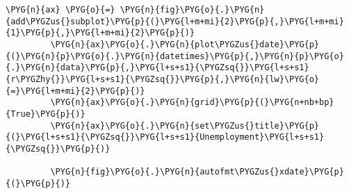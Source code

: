 \documentclass[letterpaper,10pt,openany,oneside,english]{sphinxmanual}
\begin{document}
\begin{Verbatim}[commandchars=\\\{\}]
         \PYG{n}{ax} \PYG{o}{=} \PYG{n}{fig}\PYG{o}{.}\PYG{n}{add\PYGZus{}subplot}\PYG{p}{(}\PYG{l+m+mi}{2}\PYG{p}{,}\PYG{l+m+mi}{1}\PYG{p}{,}\PYG{l+m+mi}{2}\PYG{p}{)}
         \PYG{n}{ax}\PYG{o}{.}\PYG{n}{plot\PYGZus{}date}\PYG{p}{(}\PYG{n}{p}\PYG{o}{.}\PYG{n}{datetimes}\PYG{p}{,}\PYG{n}{p}\PYG{o}{.}\PYG{n}{data}\PYG{p}{,}\PYG{l+s+s1}{\PYGZsq{}}\PYG{l+s+s1}{r\PYGZhy{}}\PYG{l+s+s1}{\PYGZsq{}}\PYG{p}{,}\PYG{n}{lw}\PYG{o}{=}\PYG{l+m+mi}{2}\PYG{p}{)}
         \PYG{n}{ax}\PYG{o}{.}\PYG{n}{grid}\PYG{p}{(}\PYG{n+nb+bp}{True}\PYG{p}{)}
         \PYG{n}{ax}\PYG{o}{.}\PYG{n}{set\PYGZus{}title}\PYG{p}{(}\PYG{l+s+s1}{\PYGZsq{}}\PYG{l+s+s1}{Unemployment}\PYG{l+s+s1}{\PYGZsq{}}\PYG{p}{)}
         
         \PYG{n}{fig}\PYG{o}{.}\PYG{n}{autofmt\PYGZus{}xdate}\PYG{p}{(}\PYG{p}{)}
\end{Verbatim}

\noindent{}
\end{document}
